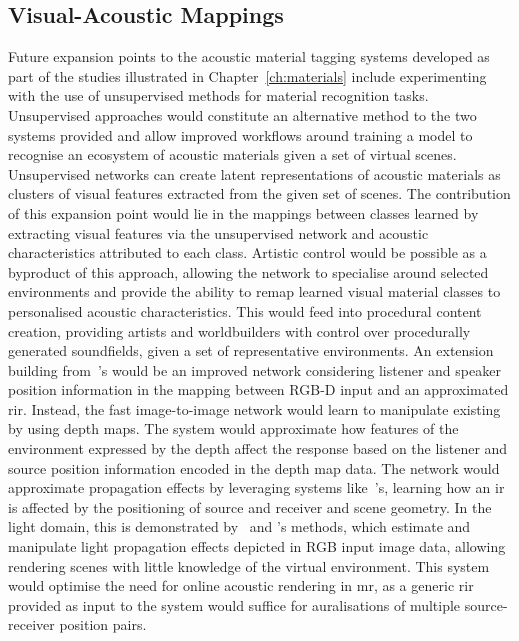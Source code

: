\subsection{Visual-Acoustic Mappings}
Future expansion points to the acoustic material tagging systems developed as part of the studies illustrated in Chapter~\ref{ch:materials} include experimenting with the use of unsupervised methods for material recognition tasks. Unsupervised approaches would constitute an alternative method to the two systems provided and allow improved workflows around training a model to recognise an ecosystem of acoustic materials given a set of virtual scenes. Unsupervised networks can create latent representations of acoustic materials as clusters of visual features extracted from the given set of scenes. The contribution of this expansion point would lie in the mappings between classes learned by extracting visual features via the unsupervised network and acoustic characteristics attributed to each class. Artistic control would be possible as a byproduct of this approach, allowing the network to specialise around selected environments and provide the ability to remap learned visual material classes to personalised acoustic characteristics. This would feed into procedural content creation, providing artists and worldbuilders with control over procedurally generated soundfields, given a set of representative environments.
An extension building from~\cite{Singh_2021_ICCV}'s would be an improved network considering listener and speaker position information in the mapping between RGB-D input and an approximated \acrshort{rir}. Instead, the fast image-to-image network would learn to manipulate existing  by using depth maps. The system would approximate how features of the environment expressed by the depth affect the response based on the listener and source position information encoded in the depth map data. The network would approximate propagation effects by leveraging systems like~\cite{chen2022soundspaces}'s, learning how an \acrshort{ir} is affected by the positioning of source and receiver and scene geometry. In the light domain, this is demonstrated by~\cite{wang2020deep} and \cite{gardner2019deep}'s methods, which estimate and manipulate light propagation effects depicted in RGB input image data, allowing rendering scenes with little knowledge of the virtual environment. This system would optimise the need for online acoustic rendering in \acrshort{mr}, as a generic \acrshort{rir} provided as input to the system would suffice for auralisations of multiple source-receiver position pairs.\par

